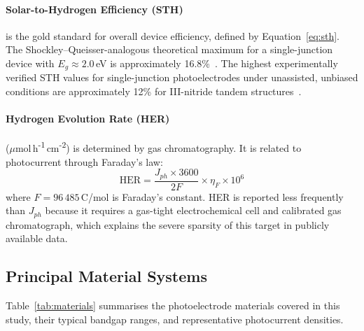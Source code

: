 \paragraph{Solar-to-Hydrogen Efficiency (STH)} is the gold standard for overall
device efficiency, defined by Equation~\eqref{eq:sth}.
The Shockley--Queisser-analogous theoretical maximum for a single-junction device
with $E_g \approx 2.0$\,eV is approximately 16.8\%~\cite{walter2010solar}.
The highest experimentally verified STH values for single-junction photoelectrodes
under unassisted, unbiased conditions are approximately 12\% for III-nitride tandem
structures~\cite{kibria2015multibandgap}.

\paragraph{Hydrogen Evolution Rate (HER)} ($\mu$mol\,h\textsuperscript{-1}\,cm\textsuperscript{-2})
is determined by gas chromatography.
It is related to photocurrent through Faraday's law:
\begin{equation}
  \mathrm{HER} = \frac{J_{ph} \times 3600}{2 F} \times \eta_F \times 10^{6}
  \label{eq:her}
\end{equation}
where $F = 96\,485$\,C/mol is Faraday's constant.
HER is reported less frequently than $J_{ph}$ because it requires a gas-tight
electrochemical cell and calibrated gas chromatograph, which explains the severe
sparsity of this target in publicly available data.

\subsection{Principal Material Systems}

Table~\ref{tab:materials} summarises the photoelectrode materials covered in this
study, their typical bandgap ranges, and representative photocurrent densities.

